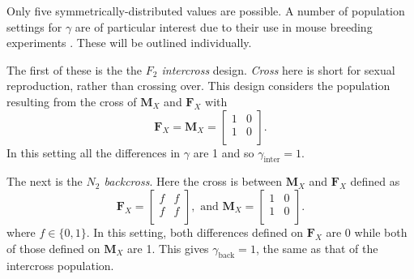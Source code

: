 \documentclass[sts]{imsart}
\newcommand{\m}[1]{\mathbf{#1}}               %
\begin{document}
Only five symmetrically-distributed values are possible. A number of population settings for $\gamma$ are of particular interest due to their use in mouse breeding experiments \cite{green1966}. These will be outlined individually.

The first of these is the the \textit{$F_2$ intercross} design. \emph{Cross} here is short for sexual reproduction, rather than crossing over. This design considers the population resulting from the cross of $\m{M}_X$ and $\m{F}_X$ with
$$\m{F}_X = \m{M}_X = \begin{bmatrix}
  1 & 0 \\
  1 & 0 \\
\end{bmatrix}.$$
In this setting all the differences in $\gamma$ are 1 and so $\gamma_{\text{inter}} = 1$.

The next is the \textit{$N_2$ backcross}. Here the cross is between $\m{M}_X$ and $\m{F}_X$ defined as
$$\m{F}_X = \begin{bmatrix}
  f & f \\
  f & f \\
\end{bmatrix}, \text{ and }
\m{M}_X = \begin{bmatrix}
  1 & 0 \\
  1 & 0 \\
\end{bmatrix}.$$
where $f \in \{0,1\}$. In this setting, both differences defined on $\m{F}_X$ are 0 while both of those defined on $\m{M}_X$ are 1. This gives $\gamma_{\text{back}} = 1$, the same as that of the intercross population.
\end{document}
